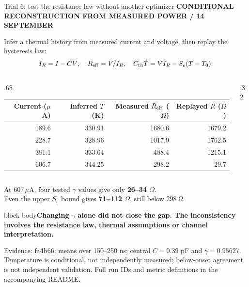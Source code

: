 \documentclass[aspectratio=169,11pt]{beamer}
\newcommand{\eyebrow}[1]{{\color{teal}\scriptsize\bfseries\MakeUppercase{#1}}\par\vspace{2mm}}
\newcommand{\takeaway}[1]{\par\vspace{2mm}\begin{beamercolorbox}[sep=2mm,wd=\linewidth]{block body}\small\bfseries #1\end{beamercolorbox}}
\newcommand{\src}[1]{\par\vfill{\fontsize{6.5}{8}\selectfont\color{muted}Evidence: #1. Full run IDs and metric definitions in the accompanying README.\par}}
\begin{document}
\begin{frame}[t]{Trial 6: test the resistance law without another optimizer}
\eyebrow{Conditional reconstruction from measured power / 14 September}
\small Infer a thermal history from measured current and voltage, then replay the hysteresis law:
\vspace{-1mm}
\[
I_R=I-C\dot V,\quad R_{\rm eff}=V/I_R,\quad
C_{\rm th}\dot T=VI_R-S_e(T-T_0).
\]
\vspace{-2mm}
\begin{columns}[T,onlytextwidth]
\begin{column}{.65\textwidth}
\renewcommand{\arraystretch}{1.3}
\begin{tabular}{@{}rrrr@{}}
\toprule
\textbf{Current ($\mu$A)} & \textbf{Inferred $T$ (K)} & \textbf{Measured $R_{\rm eff}$ ($\Omega$)} & \textbf{Replayed $R$ ($\Omega$)}\\\midrule
189.6 & 330.91 & 1680.6 & 1679.2\\
228.7 & 328.96 & 1017.9 & 1762.5\\
381.1 & 333.64 & 488.4 & 1215.1\\
606.7 & 344.25 & 298.2 & 29.7\\\bottomrule
\end{tabular}\par
\end{column}
\begin{column}{.32\textwidth}
\end{column}
\end{columns}
\vspace{3mm}
\small At $607\,\mu$A, four tested $\gamma$ values give only \textbf{26--34 $\Omega$}.\\
Even the upper $S_e$ bound gives \textbf{71--112 $\Omega$}, still below $298\,\Omega$.
\takeaway{Changing $\gamma$ alone did not close the gap. The inconsistency involves the resistance law, thermal assumptions or channel interpretation.}
\src{fa4b66; means over 150--250 ns; central $C=0.39$ pF and $\gamma=0.95627$. Temperature is conditional, not independently measured; below-onset agreement is not independent validation}
\end{frame}
\end{document}
